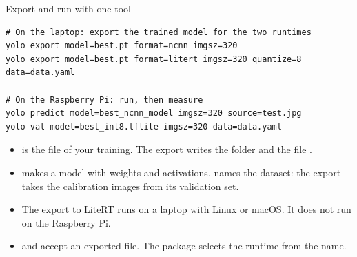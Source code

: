 \begin{frame}[fragile]{Export and run with one tool}
\begin{lstlisting}[style=shell]
# On the laptop: export the trained model for the two runtimes
yolo export model=best.pt format=ncnn imgsz=320
yolo export model=best.pt format=litert imgsz=320 quantize=8 data=data.yaml

# On the Raspberry Pi: run, then measure
yolo predict model=best_ncnn_model imgsz=320 source=test.jpg
yolo val model=best_int8.tflite imgsz=320 data=data.yaml
\end{lstlisting}
  \small
  \begin{itemize}
    \item {} is the file of your training. The export writes
          the folder  and the file
          .
    \item {} makes a model with  weights and
           activations.  names the dataset: the
          export takes the calibration images from its validation set.
    \item The export to LiteRT runs on a laptop with Linux or macOS. It
          does not run on the Raspberry Pi.
    \item {} and  accept an exported file. The
          package selects the runtime from the name.
  \end{itemize}
\end{frame}

